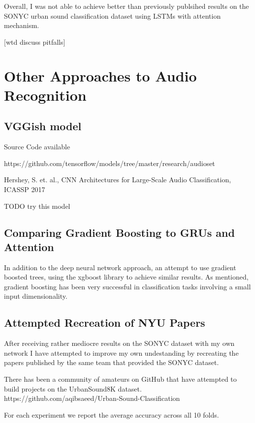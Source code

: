 Overall, I was not able to achieve better than previously publsihed results on the SONYC urban sound classification dataset using LSTMs with attention mechanism.

[wtd discuss pitfalls]

\chapter{Other Approaches to Audio Recognition}

\section{VGGish model}
\label{vggish}

Source Code available

https://github.com/tensorflow/models/tree/master/research/audioset

Hershey, S. et. al., CNN Architectures for Large-Scale Audio Classification, ICASSP 2017

TODO try this model

\section{Comparing Gradient Boosting to GRUs and Attention}

In addition to the deep neural network approach, an attempt to use gradient boosted trees, using the xgboost library \cite{DBLP:journals/corr/ChenG16} to achieve similar results.  As mentioned, gradient boosting has been very successful in classification tasks involving a small input dimensionality.

\newpage



\section{Attempted Recreation of NYU Papers}

After receiving rather mediocre results on the SONYC dataset with my own network I have attempted to improve my own undestanding by recreating the papers published by the same team that provided the SONYC dataset.

There has been a community of amateurs on GitHub that have attempted to build projects on the UrbanSound8K dataset. https://github.com/aqibsaeed/Urban-Sound-Classification



For each experiment we report the average accuracy across all 10 folds.

